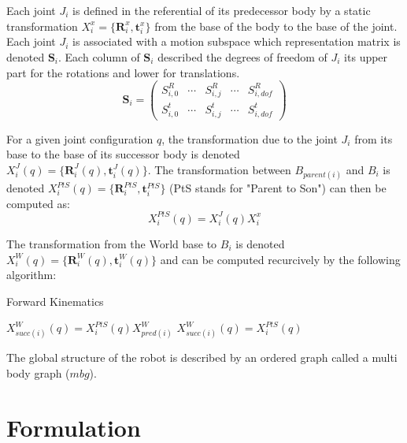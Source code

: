 Each joint $J_i$ is defined in the referential of its predecessor body by a static transformation $X^x_i = \{\mathbf{R}^x_i, \mathbf{t}^x_i\}$ from the base of the body to the base of the joint.
Each joint $J_i$ is associated with a motion subspace which representation matrix is denoted $\mathbf{S}_i$. Each column of $\mathbf{S}_i$ described the degrees of freedom of $J_i$ its upper part for the rotations and lower for translations.
\begin{equation}
  \mathbf{S}_i =
  \begin{pmatrix}
    S^R_{i,0} & \cdots &
    S^R_{i,j} & \cdots &
    S^R_{i,dof} \\
    S^t_{i,0} & \cdots &
    S^t_{i,j} & \cdots &
    S^t_{i,dof}
  \end{pmatrix}
\end{equation}

For a given joint configuration $q$, the transformation due to the joint $J_i$ from its base to the base of its successor body is denoted \\$X^J_i(q) = \{\mathbf{R}^J_i(q), \mathbf{t}^J_i(q)\}$.
The transformation between $B_{parent(i)}$ and $B_i$ is denoted $X^{PtS}_i(q) = \{\mathbf{R}^{PtS}_i, \mathbf{t}^{PtS}_i\}$ (PtS stands for "Parent to Son") can then be computed as:
\begin{equation}
  X^{PtS}_i(q) = X^J_i(q) X^x_i
\end{equation}

The transformation from the World base to $B_i$ is denoted \\ $X^W_i(q) = \{\mathbf{R}^W_i(q), \mathbf{t}^W_i(q)\}$ and can be computed recurcively by the following algorithm:

\begin{algorithm}
  \caption{Forward Kinematics}
  \label{FK}
\begin{algorithmic}
   $X^W_{succ(i)}(q) = X^{PtS}_i(q)X^W_{pred(i)}$
  \Else $X^W_{succ(i)}(q) = X^{PtS}_i(q)$
  \EndIf
  \EndFor
\end{algorithmic}
\end{algorithm}

The global structure of the robot is described by an ordered graph called a multi body graph ($mbg$).





\section{Formulation}

